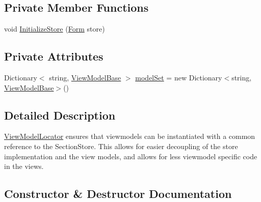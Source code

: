 \subsection*{Private Member Functions}
\begin{DoxyCompactItemize}
\item 
void \mbox{\hyperlink{class_listen_to_me_1_1_view_model_1_1_view_model_locator_ad6b566b8472eec5e6e2655e150c04cde}{Initialize\+Store}} (\mbox{\hyperlink{class_listen_to_me_1_1_model_1_1_form}{Form}} store)
\end{DoxyCompactItemize}
\subsection*{Private Attributes}
\begin{DoxyCompactItemize}
\item 
Dictionary$<$ string, \mbox{\hyperlink{class_listen_to_me_1_1_view_model_1_1_view_model_base}{View\+Model\+Base}} $>$ \mbox{\hyperlink{class_listen_to_me_1_1_view_model_1_1_view_model_locator_a07ebd298d4e133fb38202d02e0cbc0ea}{model\+Set}} = new Dictionary$<$string, \mbox{\hyperlink{class_listen_to_me_1_1_view_model_1_1_view_model_base}{View\+Model\+Base}}$>$()
\end{DoxyCompactItemize}


\subsection{Detailed Description}
\mbox{\hyperlink{class_listen_to_me_1_1_view_model_1_1_view_model_locator}{View\+Model\+Locator}} ensures that viewmodels can be instantiated with a common reference to the Section\+Store. This allows for easier decoupling of the store implementation and the view models, and allows for less viewmodel specific code in the views. 



\subsection{Constructor \& Destructor Documentation}
\mbox{\label{class_listen_to_me_1_1_view_model_1_1_view_model_locator_a50210a77a76da746801409d1787c1660}} 

